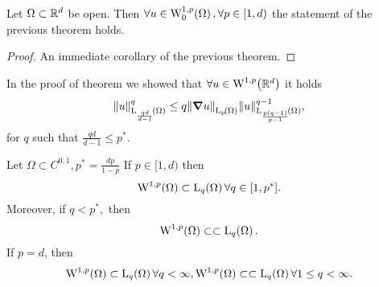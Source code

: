 \documentclass{article}
\begin{document}
\begin{theorem}
	Let $\Omega \subset {\mathbb R}^d$ be open. Then $\forall u \in \WkpzeroSet[1][p]{\Omega}, \forall p \in [1,d)$ the statement of the previous theorem holds.
\end{theorem}
\begin{proof}
	An immediate corollary of the previous theorem.
\end{proof}

\begin{remark}
	In the proof of theorem we showed that $\forall u \in \WkpSet[1][p]{\R^d}$ it holds
	\[
		\norm{u}_{\LpSet[\frac{qd}{d-1}]{\Omega}}^q \leq q\norm{\grad u}_{\LpSet{\Omega}} \norm{u}_{\LpSet[\frac{p\qty(q-1)}{p-1}]{\Omega}}^{q-1},
	\]
	for $q$ such that $\frac{qd}{d-1}\leq p^{*}$.
\end{remark}


\begin{theorem}
	Let $\Omega \subset C^{0,1}, p^{*} = \frac{dp}{1-p}$ If $p \in [1,d)$ then
	\[
		\WkpSet[1][p]{\Omega} \subset \LpSet[q]{\Omega} \forall q \in [1,p^{*}].
	\]
	Moreover, if $q < p^{*}, $ then
	\[
		\WkpSet[1][p]{\Omega} \subset \subset \LpSet[q]{\Omega}.
	\]
	If $p=d$, then
	\[
		\WkpSet[1][p]{\Omega} \subset \LpSet[q]{\Omega} \forall q < \infty, \WkpSet[1][p]{\Omega} \subset \subset \LpSet[q]{\Omega} \forall 1 \leq q < \infty.
	\]
\end{theorem}
\end{document}
